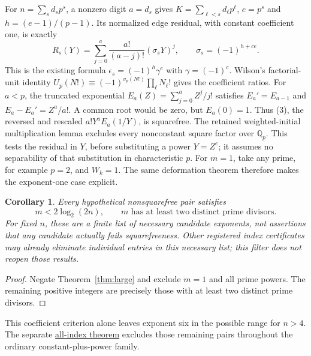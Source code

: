 \documentclass[11pt]{article}
\newtheorem{corollary}[theorem]{Corollary}
\newcommand{\Q}{\mathbb Q}
\begin{document}
For $n=\sum_s d_sp^s$, a nonzero digit $a=d_s$ gives $K=\sum_{\ell<s}d_\ell p^\ell$,
$e=p^s$ and $h=(e-1)/(p-1)$.
Its normalized edge residual, with constant coefficient one, is exactly
\[
 R_s(Y)=\sum_{j=0}^a\frac{a!}{(a-j)!}(\sigma_sY)^j,
 \qquad\sigma_s=(-1)^{h+ce}. \tag{3}
\]
This is the existing formula $\epsilon_s=(-1)^h\gamma^e$ with
$\gamma=(-1)^c$. Wilson's factorial-unit identity
$U_p(N!)\equiv(-1)^{v_p(N!)}\prod_\ell N_\ell!$ gives the coefficient ratios.
For $a<p$, the truncated exponential $E_a(Z)=\sum_{j=0}^aZ^j/j!$
satisfies $E_a'=E_{a-1}$ and $E_a-E_a'=Z^a/a!$.
A common root would be zero, but $E_a(0)=1$.
Thus (3), the reversed and rescaled $a!Y^aE_a(1/Y)$, is squarefree.
The retained weighted-initial multiplication lemma excludes every
nonconstant square factor over $\Q_p$.
This tests the residual in $Y$, before substituting a power $Y=Z^e$;
it assumes no separability of that substitution in characteristic $p$.
For $m=1$, take any prime, for example $p=2$, and $W_k=1$.
The same deformation theorem therefore makes the exponent-one case explicit.

\begin{corollary}\label{cor:candidates}
Every hypothetical nonsquarefree pair satisfies
\[
 \boxed{m<2\log_2(2n),\qquad m\text{ has at least two distinct prime divisors}.}
\]
For fixed $n$, these are a finite list of necessary candidate exponents,
not assertions that any candidate actually fails squarefreeness.
Other registered index certificates may already eliminate individual
entries in this necessary list; this filter does not reopen those results.
\end{corollary}
\begin{proof}
Negate Theorem~\ref{thm:large} and exclude $m=1$ and all prime powers.
The remaining positive integers are precisely those with at least two
distinct prime divisors.
\end{proof}
This coefficient criterion alone leaves exponent six in the possible
range for $n>4$. The separate
\href{ALL_UNIVARIATE_TWO_TERM_SFC.tex}{all-index theorem} excludes those
remaining pairs throughout the ordinary constant-plus-power family.
\end{document}
